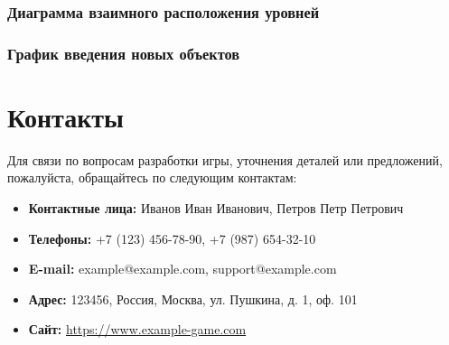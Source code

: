 \documentclass{article}
\begin{document}
\subsubsection{Диаграмма взаимного расположения уровней}
\subsubsection{График введения новых объектов}

\section{Контакты}
Для связи по вопросам разработки игры, уточнения деталей или предложений, пожалуйста, обращайтесь по следующим контактам:
\begin{itemize}
    \item \textbf{Контактные лица:} Иванов Иван Иванович, Петров Петр Петрович
    \item \textbf{Телефоны:} +7 (123) 456-78-90, +7 (987) 654-32-10
    \item \textbf{E-mail:} example@example.com, support@example.com
    \item \textbf{Адрес:} 123456, Россия, Москва, ул. Пушкина, д. 1, оф. 101
    \item \textbf{Сайт:} \url{https://www.example-game.com}
\end{itemize}

\newpage
\end{document}
